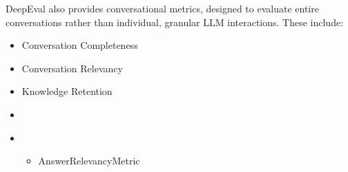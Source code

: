 \documentclass[letterpaper,11pt,english]{sphinxmanual}
\begin{document}
\sphinxAtStartPar
DeepEval also provides conversational metrics, designed to evaluate entire
conversations rather than individual, granular LLM interactions. These include:
\begin{itemize}
\item {} 
\sphinxAtStartPar
Conversation Completeness

\item {} 
\sphinxAtStartPar
Conversation Relevancy

\item {} 
\sphinxAtStartPar
Knowledge Retention

\end{itemize}
\begin{itemize}
\item {} 
\sphinxAtStartPar
{}
\begin{quote}

\begin{sphinxVerbatim}[commandchars=\\\{\}]
   \PYGZbs{}
 \PYGZbs{}
\end{sphinxVerbatim}
\end{quote}

\item {} 
\sphinxAtStartPar
{}
\begin{itemize}
\item {} 
\sphinxAtStartPar
AnswerRelevancyMetric
\begin{quote}

\begin{sphinxVerbatim}[commandchars=\\\{\}]
   
   
   


\end{sphinxVerbatim}
\end{quote}
\end{itemize}
\end{itemize}
\end{document}
